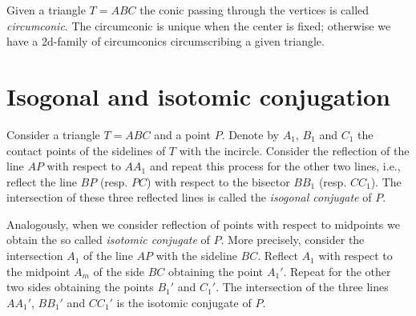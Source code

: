 Given a triangle $T=ABC$ the conic passing through the vertices is called {\em circumconic}. The circumconic is unique when the center is fixed; otherwise we have a 2d-family of circumconics circumscribing a given triangle. 



	\section{Isogonal and isotomic conjugation}
	
	Consider a triangle $T=ABC$ and a point $P$. Denote by $A_1$, $B_1$ and $C_1$ the contact points of the sidelines of $T$ with the incircle. Consider the reflection of the line $AP$ with respect to $AA_1$ and repeat this process for the other two lines, i.e., reflect the line $BP$ (resp. $PC$) with respect to the bisector $BB_1$ (resp. $CC_1$).
	The intersection of these three reflected lines is called the {\em isogonal conjugate} of $P$. 
	
	Analogously, when we consider reflection of points  with respect to midpoints   we obtain the so called {\em isotomic conjugate} of $P$. More precisely, consider the intersection $A_1$ of the line $AP$ with the sideline $BC$. Reflect $A_1$ with respect to the midpoint $A_m$ of the side $BC$ obtaining the point $A_1'$. Repeat for the other two sides obtaining the points $B_1'$ and $C_1'$. The intersection of the three lines $AA_1'$, $BB_1'$ and $CC_1'$ is the isotomic conjugate of $P$.
	
